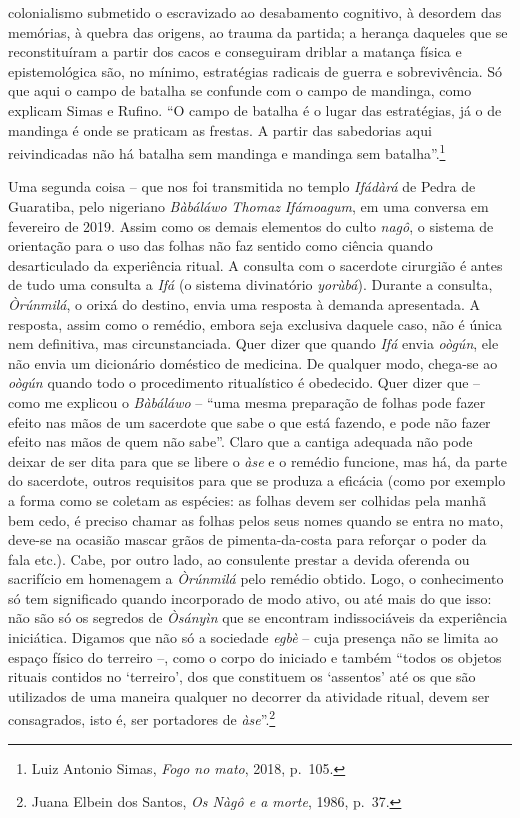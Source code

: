 colonialismo submetido o escravizado ao desabamento cognitivo, à
desordem das memórias, à quebra das origens, ao trauma da partida; a
herança daqueles que se reconstituíram a partir dos cacos e conseguiram
driblar a matança física e epistemológica são, no mínimo, estratégias
radicais de guerra e sobrevivência. Só que aqui o campo de batalha se
confunde com o campo de mandinga, como explicam Simas e Rufino. ``O
campo de batalha é o lugar das estratégias, já o de mandinga é onde se
praticam as frestas. A partir das sabedorias aqui reivindicadas não há
batalha sem mandinga e mandinga sem batalha''.\footnote{Luiz Antonio
  Simas, \emph{Fogo no mato}, 2018, p.~105.}

Uma segunda coisa -- que nos foi transmitida no templo \emph{Ifádàrá} de
Pedra de Guaratiba, pelo nigeriano \emph{Bàbáláwo} \emph{Thomaz}
\emph{Ifámoagum}, em uma conversa em fevereiro de 2019. Assim como os
demais elementos do culto \emph{nagô}, o sistema de orientação para o
uso das folhas não faz sentido como ciência quando desarticulado da
experiência ritual. A consulta com o sacerdote cirurgião é antes de tudo
uma consulta a \emph{Ifá} (o sistema divinatório \emph{yorùbá}). Durante
a consulta, \emph{Òrúnmilá}, o orixá do destino, envia uma resposta à
demanda apresentada. A resposta, assim como o remédio, embora seja
exclusiva daquele caso, não é única nem definitiva, mas circunstanciada.
Quer dizer que quando \emph{Ifá} envia \emph{oògún}, ele não envia um
dicionário doméstico de medicina. De qualquer modo, chega-se ao
\emph{oògún} quando todo o procedimento ritualístico é obedecido. Quer
dizer que -- como me explicou o \emph{Bàbáláwo} -- ``uma mesma
preparação de folhas pode fazer efeito nas mãos de um sacerdote que sabe
o que está fazendo, e pode não fazer efeito nas mãos de quem não sabe''.
Claro que a cantiga adequada não pode deixar de ser dita para que se
libere o \emph{àse} e o remédio funcione, mas há, da parte do sacerdote,
outros requisitos para que se produza a eficácia (como por exemplo a
forma como se coletam as espécies: as folhas devem ser colhidas pela
manhã bem cedo, é preciso chamar as folhas pelos seus nomes quando se
entra no mato, deve-se na ocasião mascar grãos de pimenta-da-costa para
reforçar o poder da fala etc.). Cabe, por outro lado, ao consulente
prestar a devida oferenda ou sacrifício em homenagem a \emph{Òrúnmilá}
pelo remédio obtido. Logo, o conhecimento só tem significado quando
incorporado de modo ativo, ou até mais do que isso: não são só os
segredos de \emph{Òsányìn} que se encontram indissociáveis da
experiência iniciática. Digamos que não só a sociedade \emph{egbè} --
cuja presença não se limita ao espaço físico do terreiro --, como o
corpo do iniciado e também ``todos os objetos rituais contidos no
`terreiro', dos que constituem os `assentos' até os que são utilizados
de uma maneira qualquer no decorrer da atividade ritual, devem ser
consagrados, isto é, ser portadores de \emph{àse}''.\footnote{Juana
  Elbein dos Santos, \emph{Os Nàgô e a morte}, 1986, p.~37.}

